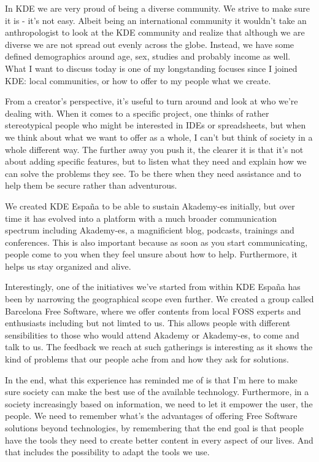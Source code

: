 

\noindent{}In KDE we are very proud of being a diverse community. We strive to make sure it is - it's not easy. Albeit being an international community it wouldn't take an anthropologist to look at the KDE community and realize that although we are diverse we are not spread out evenly across the globe. Instead, we have some defined demographics around age, sex, studies and probably income as well. What I want to discuss today is one of my longstanding focuses since I joined KDE: local communities, or how to offer to my people what we create.

From a creator's perspective, it's useful to turn around and look at who we're dealing with. When it comes to a specific project, one thinks of rather stereotypical people who might be interested in IDEs or spreadsheets, but when we think about what we want to offer as a whole, I can't but think of society in a whole different way. The further away you push it, the clearer it is that it's not about adding specific features, but to listen what they need and explain how we can solve the problems they see. To be there when they need assistance and to help them be secure rather than adventurous.

We created KDE España to be able to sustain Akademy-es initially, but over time it has evolved into a platform with a much broader communication spectrum including Akademy-es, a magnificient blog, podcasts, trainings and conferences. This is also important because as soon as you start communicating, people come to you when they feel unsure about how to help. Furthermore, it helps us stay organized and alive.

Interestingly, one of the initiatives we've started from within KDE España has been by narrowing the geographical scope even further. We created a group called Barcelona Free Software, where we offer contents from local FOSS experts and enthusiasts including but not limted to us. This allows people with different sensibilities to those who would attend Akademy or Akademy-es, to come and talk to us. The feedback we reach at such gatherings is interesting as it shows the kind of problems that our people ache from and how they ask for solutions.

In the end, what this experience has reminded me of is that I'm here to make sure society can make the best use of the available technology. Furthermore, in a society increasingly based on information, we need to let it empower the user, the people. We need to remember what's the advantages of offering Free Software solutions beyond technologies, by remembering that the end goal is that people have the tools they need to create better content in every aspect of our lives. And that includes the possibility to adapt the tools we use.

